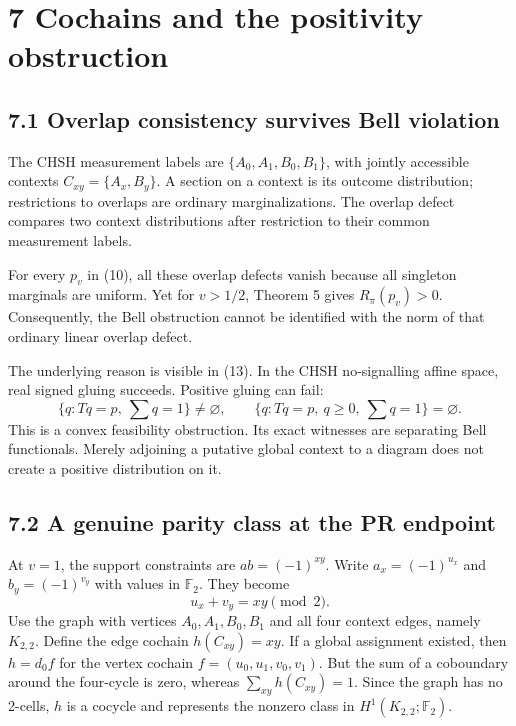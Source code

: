 \documentclass[
]{article}
\begin{document}
\section{7 Cochains and the positivity obstruction}\label{cochains-and-the-positivity-obstruction}

\subsection{7.1 Overlap consistency survives Bell violation}\label{overlap-consistency-survives-bell-violation}

The CHSH measurement labels are \(\{A_0,A_1,B_0,B_1\}\), with jointly accessible contexts \(C_{xy}=\{A_x,B_y\}\). A section on a context is its outcome distribution; restrictions to overlaps are ordinary marginalizations. The overlap defect compares two context distributions after restriction to their common measurement labels.

For every \(p_v\) in (10), all these overlap defects vanish because all singleton marginals are uniform. Yet for \(v>1/2\), Theorem 5 gives \(R_\pi(p_v)>0\). Consequently, the Bell obstruction cannot be identified with the norm of that ordinary linear overlap defect.

The underlying reason is visible in (13). In the CHSH no-signalling affine space, real signed gluing succeeds. Positive gluing can fail:
\[
\{q:Tq=p,\ \textstyle\sum q=1\}\ne\varnothing,
\qquad
\{q:Tq=p,\ q\ge0,\ \textstyle\sum q=1\}=\varnothing.
\tag{22}
\]
This is a convex feasibility obstruction. Its exact witnesses are separating Bell functionals. Merely adjoining a putative global context to a diagram does not create a positive distribution on it.

\subsection{7.2 A genuine parity class at the PR endpoint}\label{a-genuine-parity-class-at-the-pr-endpoint}

At \(v=1\), the support constraints are \(ab=(-1)^{xy}\). Write \(a_x=(-1)^{u_x}\) and \(b_y=(-1)^{v_y}\) with values in \(\mathbb F_2\). They become
\[
u_x+v_y=xy\pmod2.
\tag{23}
\]
Use the graph with vertices \(A_0,A_1,B_0,B_1\) and all four context edges, namely \(K_{2,2}\). Define the edge cochain \(h(C_{xy})=xy\). If a global assignment existed, then \(h=d_0 f\) for the vertex cochain \(f=(u_0,u_1,v_0,v_1)\). But the sum of a coboundary around the four-cycle is zero, whereas \(\sum_{xy}h(C_{xy})=1\). Since the graph has no 2-cells, \(h\) is a cocycle and represents the nonzero class in \(H^1(K_{2,2};\mathbb F_2)\).
\end{document}
